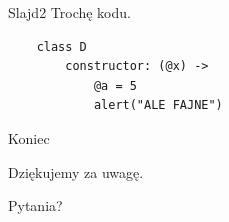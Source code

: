 \documentclass[xcolor=dvipsnames]{beamer}
\begin{document}
\begin{frame}[fragile]{Slajd2}
    Trochę kodu.

    \begin{verbatim}    
    class D
        constructor: (@x) ->
            @a = 5
            alert("ALE FAJNE")
    \end{verbatim}
\end{frame}

\begin{frame}[fragile]{Koniec}
    \begin{center}
        Dziękujemy za uwagę.
        
        \vspace{2 cm}
        \pause
        Pytania?
    \end{center}
\end{frame}
\end{document}
